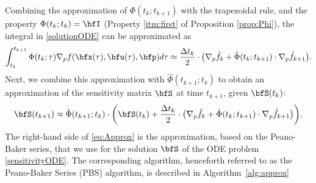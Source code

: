 \documentclass[DIV=12]{scrartcl} %
\theoremstyle{definition}
\begin{document}
Combining the approximation of $\Phi (t_k; t_{k+1})$ with the trapezoidal rule, and the property $\Phi(t_k;t_k)=\bfI$ (Property \ref{itm:first} of Proposition \ref{prop:Phi}), the integral in \eqref{solutionODE} can be approximated as 
\[
\int_{t_{k}}^{t_{k+1}}\Phi(t_{k};\tau)\nabla_pf(\bfx(\tau),\bfu(\tau),\bfp)d\tau \approx \frac{\Delta t_k}{2}\cdot\bigl(\nabla_p\hat{f}_k + \hat{\Phi}(t_k;t_{k+1})\cdot \nabla_p\hat{f}_{k+1}\bigr).
\]
Next, we combine this approximation with $\hat \Phi(t_{k+1};t_k)$ to obtain an approximation of the sensitivity matrix $\bfS$ at time $t_{k+1}$, given $\bfS(t_k)$:
\begin{align}
\label{eq:Approx}
    \bfS(t_{k+1})\approx  \hat{\Phi}(t_{k+1};t_k)\cdot\biggl(\bfS(t_k)+\frac{\Delta t_k}{2}\cdot\bigl(\nabla_p\hat{f}_k + \hat{\Phi}(t_k;t_{k+1})\cdot \nabla_p\hat{f}_{k+1}\bigr)\biggr).
\end{align}
The right-hand side of \eqref{eq:Approx} is the approximation, based on the Peano-Baker series, that we use for the solution $\bfS$ of the ODE problem \eqref{sensitivityODE}. The corresponding algorithm, henceforth referred to as the Peano-Baker Series (PBS) algorithm, is described in Algorithm~\ref{alg:approx}
\end{document}

